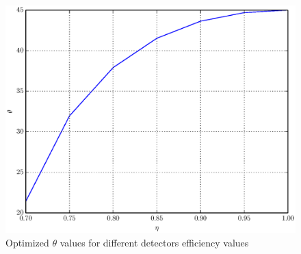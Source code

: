 \documentclass[%
master,         %
subf,           %
href,           %
colorlinks=true %
]{disser}
\numberwithin{equation}{section}
\numberwithin{figure}{section}
\begin{document}
\begin{figure}[h]
\includegraphics[scale=0.7]{theta.eps}
\caption{Optimized $\theta$ values for different detectors efficiency values}
\label{fig:theta_opt}
\end{figure}
\end{document}
